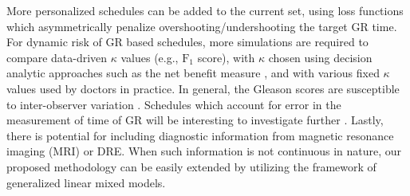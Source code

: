 More personalized schedules can be added to the current set, using loss functions which asymmetrically penalize overshooting/undershooting the target GR time. For dynamic risk of GR based schedules, more simulations are required to compare data-driven $\kappa$ values (e.g., $\mbox{F}_1$ score), with $\kappa$ chosen using decision analytic approaches such as the net benefit measure \citep{vickers2006decision}, and with various fixed $\kappa$ values used by doctors in practice. In general, the Gleason scores are susceptible to inter-observer variation \citep{Gleason_interobs_var}. Schedules which account for error in the measurement of time of GR will be interesting to investigate further \citep{coley2017}. Lastly, there is potential for including diagnostic information from magnetic resonance imaging (MRI) or DRE. When such information is not continuous in nature, our proposed methodology can be easily extended by utilizing the framework of generalized linear mixed models.
